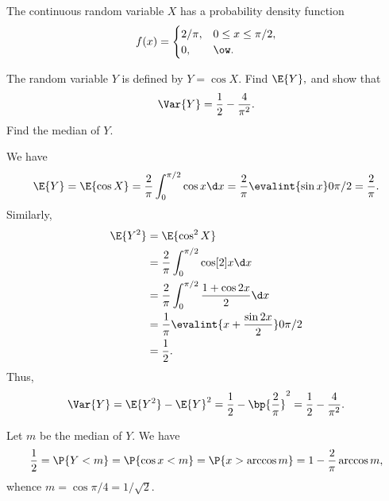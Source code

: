 \begin{problem}
    The continuous random variable $X$ has a probability density function \[f(x) = \begin{cases}
        2/\pi, & 0 \leq x \leq \pi/2,\\
        0, & \ow.
    \end{cases}\]
    
    The random variable $Y$ is defined by $Y=\cos X.$ Find $\E{Y},$ and show that \[\Var{Y} = \frac12 - \frac4{\pi^2}.\] Find the median of $Y$.
\end{problem}
\begin{solution}
    We have \[\E{Y} = \E{\cos X} = \frac2\pi \int_0^{\pi/2} \cos{x} \d x = \frac2\pi \evalint{\sin x}0{\pi/2} = \frac2\pi.\] Similarly,
    \begin{align*}
        \E{Y^2} &= \E{\cos^2 X}\\
        &= \frac2\pi \int_0^{\pi/2} \cos[2]{x} \d x\\
        &= \frac2\pi \int_0^{\pi/2} \frac{1 + \cos{2x}}{2} \d x\\
        &= \frac1\pi \evalint{x + \frac{\sin 2x}2}0{\pi/2}\\
        &= \frac12.
    \end{align*}
    Thus, \[\Var{Y} = \E{Y^2} - \E{Y}^2 = \frac12 - \bp{\frac2\pi}^2 = \frac12 - \frac4{\pi^2}.\]

    Let $m$ be the median of $Y$. We have \[\frac12 = \P{Y < m} = \P{\cos x < m} = \P{x > \arccos m} = 1 - \frac2\pi \arccos m,\] whence $m = \cos{\pi/4} = 1/\sqrt2$.
\end{solution}


